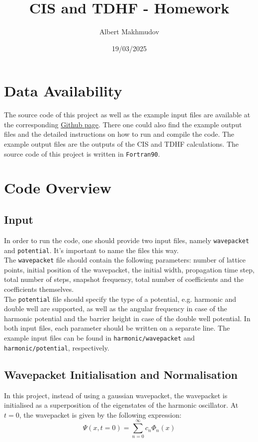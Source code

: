 \documentclass[12pt]{article}
\title{CIS and TDHF - Homework}
\author{Albert Makhmudov}
\date{19/03/2025}
\begin{document}
\maketitle

\section*{Data Availability}
The source code of this project as well as the example input files are available at the corresponding \href{https://github.com/almakhmudov/LTTC-Homework--CIS-TDHF}{Github page}. There one could also find the example output files and the detailed instructions on how to run and compile the code. The example output files are the outputs of the CIS and TDHF calculations. The source code of this project is written in \texttt{Fortran90}. \\

\section*{Code Overview}

\subsection*{Input}
In order to run the code, one should provide two input files, namely \texttt{wavepacket} and \texttt{potential}. It's important to name the files this way. \\

The \texttt{wavepacket} file should contain the following parameters: number of lattice points, initial position of the wavepacket, the initial width, propagation time step, total number of steps, snapshot frequency, total number of coefficients and the coefficients themselves. \\

The \texttt{potential} file should specify the type of a potential, e.g. harmonic and double well are supported, as well as the angular frequency in case of the harmonic potential and the barrier height in case of the double well potential. In both input files, each parameter should be written on a separate line. The example input files can be found in \texttt{harmonic/wavepacket} and \texttt{harmonic/potential}, respectively. \\

\subsection*{Wavepacket Initialisation and Normalisation}
In this project, instead of using a gaussian wavepacket, the wavepacket is initialised as a superposition of the eigenstates of the harmonic oscillator. At $t = 0$, the wavepacket is given by the following expression:
\begin{equation}
    \Psi(x, t = 0) = \sum_{n=0}^{\infty} c_n \Phi_n(x)
\label{eq:wavepacket}
\end{equation}
\end{document}
